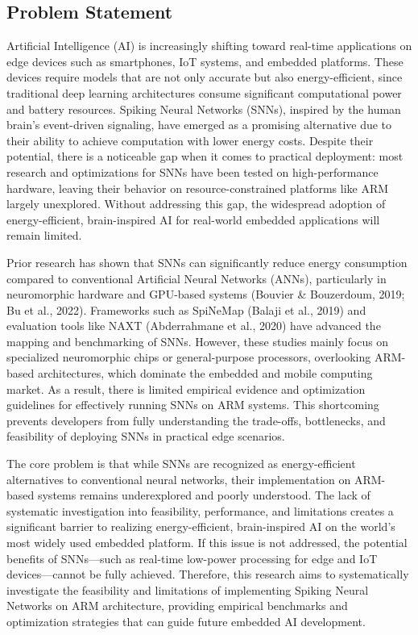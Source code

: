 \subsection{Problem Statement}
Artificial Intelligence (AI) is increasingly shifting toward real-time applications on edge devices such as smartphones, IoT systems, and embedded platforms. These devices require models that are not only accurate but also energy-efficient, since traditional deep learning architectures consume significant computational power and battery resources. Spiking Neural Networks (SNNs), inspired by the human brain’s event-driven signaling, have emerged as a promising alternative due to their ability to achieve computation with lower energy costs. Despite their potential, there is a noticeable gap when it comes to practical deployment: most research and optimizations for SNNs have been tested on high-performance hardware, leaving their behavior on resource-constrained platforms like ARM largely unexplored. Without addressing this gap, the widespread adoption of energy-efficient, brain-inspired AI for real-world embedded applications will remain limited.

Prior research has shown that SNNs can significantly reduce energy consumption compared to conventional Artificial Neural Networks (ANNs), particularly in neuromorphic hardware and GPU-based systems (Bouvier \& Bouzerdoum, 2019; Bu et al., 2022). Frameworks such as SpiNeMap (Balaji et al., 2019) and evaluation tools like NAXT (Abderrahmane et al., 2020) have advanced the mapping and benchmarking of SNNs. However, these studies mainly focus on specialized neuromorphic chips or general-purpose processors, overlooking ARM-based architectures, which dominate the embedded and mobile computing market. As a result, there is limited empirical evidence and optimization guidelines for effectively running SNNs on ARM systems. This shortcoming prevents developers from fully understanding the trade-offs, bottlenecks, and feasibility of deploying SNNs in practical edge scenarios.

The core problem is that while SNNs are recognized as energy-efficient alternatives to conventional neural networks, their implementation on ARM-based systems remains underexplored and poorly understood. The lack of systematic investigation into feasibility, performance, and limitations creates a significant barrier to realizing energy-efficient, brain-inspired AI on the world’s most widely used embedded platform. If this issue is not addressed, the potential benefits of SNNs—such as real-time low-power processing for edge and IoT devices—cannot be fully achieved. Therefore, this research aims to systematically investigate the feasibility and limitations of implementing Spiking Neural Networks on ARM architecture, providing empirical benchmarks and optimization strategies that can guide future embedded AI development.


